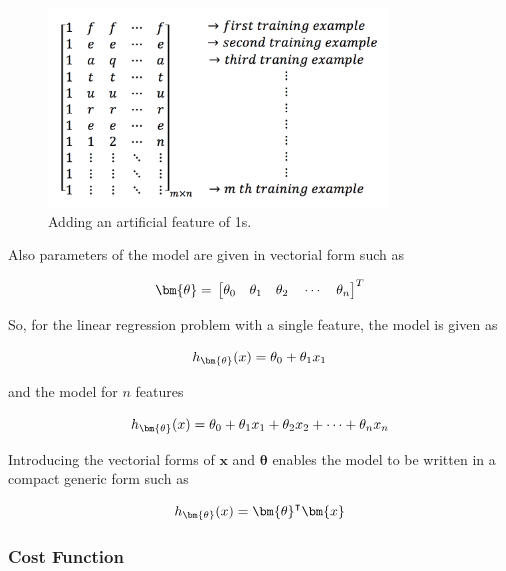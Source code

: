 \begin{figure}
\begin{center}
\includegraphics[width=9cm]{figures/addArtificialFeature}    %
\caption{Adding an artificial feature of 1s.} 
\label{fig:addArtificialFeature}
\end{center}
\end{figure}

Also parameters of the model are given in vectorial form such as

\begin{equation}{\label{eqn:parameterVector}}
\bm{\theta}
=\,
\begin{bmatrix}
\theta_0\quad \theta_1 \quad  \theta_2 \quad \cdots \quad \theta_n 
\end{bmatrix}
^T
\end{equation} 

So, for the linear regression problem with a single feature, the model is given as

\begin{equation}{\label{eqn:costFuncOneFeature}}
h_{{\bm{\theta}}}(x) = \theta_0 + \theta_1 x_1
\end{equation} 

and the model for $n$ features

\begin{equation}{\label{eqn:costFuncMltplFeature}}
h_{{\bm{\theta}}}(x) = \theta_0 + \theta_1 x_1 + \theta_2 x_2 + \cdots+ \theta_n x_n
\end{equation}

Introducing the vectorial forms of $\bm{x}$ and $\bm{\theta}$ enables the model to be written in a compact generic form such as 

\begin{equation}{\label{eqn:costFuncMltplFeature}}
h_{{\bm{\theta}}}(x) = {\bm{\theta}}^\intercal \bm{x}
\end{equation}

\subsubsection{Cost Function}

